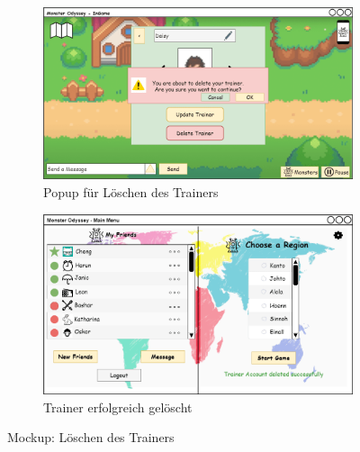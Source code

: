 \begin{figure}[H]
    \centering
    \begin{subfigure}[b]{0.4\textwidth}
        \includegraphics[width=\textwidth]{images/mockups/Bonusfeatures/TrainerSettings/IngameDeleteTrainerPopup.png}
        \caption{Popup für Löschen des Trainers}
        \label{fig: Popup beim Löschen des Trainers}
    \end{subfigure}
    \hfill
    \begin{subfigure}[b]{0.4\textwidth}
        \includegraphics[width=\textwidth]{images/mockups/Bonusfeatures/TrainerSettings/TrainerAccountDeleted.png}
        \caption{Trainer erfolgreich gelöscht}
        \label{fig: Trainer erfolgreich gelöscht}
    \end{subfigure}
    \caption{Mockup: Löschen des Trainers}
    \label{fig: Löschen des Trainers}
\end{figure}
